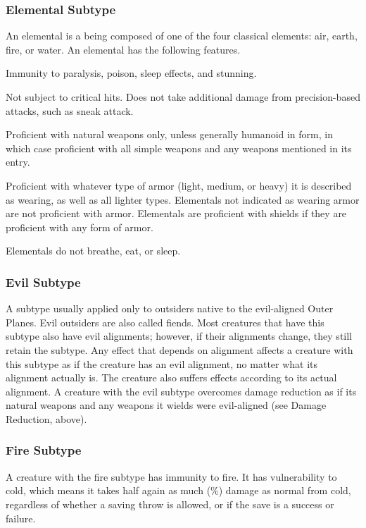 \subsubsection{Elemental Subtype} An elemental is a being composed of one of the four classical elements: air, earth, fire, or water.
 An elemental has the following features.
\begin{itemize*}
\item Immunity to paralysis, poison, sleep effects, and stunning.
\item Not subject to critical hits. Does not take additional damage from precision-based attacks, such as sneak attack.
\item Proficient with natural weapons only, unless generally humanoid in form, in which case proficient with all simple weapons and any weapons mentioned in its entry.
\item Proficient with whatever type of armor (light, medium, or heavy) it is described as wearing, as well as all lighter types. Elementals not indicated as wearing armor are not proficient with armor. Elementals are proficient with shields if they are proficient with any form of armor.
\item Elementals do not breathe, eat, or sleep.
\end{itemize*}

\subsubsection{Evil Subtype} A subtype usually applied only to outsiders native to the evil-aligned Outer Planes. Evil outsiders are also called fiends. Most creatures that have this subtype also have evil alignments; however, if their alignments change, they still retain the subtype. Any effect that depends on alignment affects a creature with this subtype as if the creature has an evil alignment, no matter what its alignment actually is. The creature also suffers effects according to its actual alignment. A creature with the evil subtype overcomes damage reduction as if its natural weapons and any weapons it wields were evil-aligned (see Damage Reduction, above).

\subsubsection{Fire Subtype} A creature with the fire subtype has immunity to fire. It has vulnerability to cold, which means it takes half again as much (\%) damage as normal from cold, regardless of whether a saving throw is allowed, or if the save is a success or failure.

